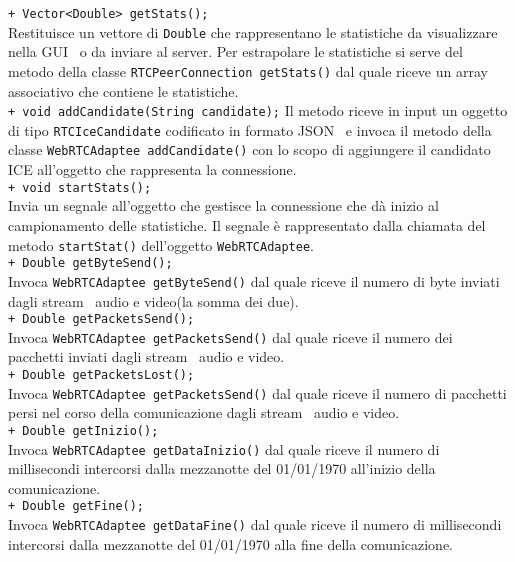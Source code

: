 {{\begin{sloppypar}
{{{\begin{itemize}
{					\texttt{+ Vector<Double> getStats();}\\
					Restituisce un vettore di \texttt{Double} che rappresentano le statistiche da visualizzare nella GUI\g~ o da inviare al server\g. Per estrapolare le statistiche si serve del metodo della classe \texttt{RTCPeerConnection getStats()} dal quale riceve un array associativo che contiene le statistiche.\\

					\texttt{+ void addCandidate(String candidate);}
					Il metodo riceve in input un oggetto di tipo \texttt{RTCIceCandidate} codificato in formato JSON\g~ e invoca il metodo della classe \texttt{WebRTCAdaptee addCandidate()} con lo scopo di aggiungere il candidato ICE all'oggetto che rappresenta la connessione.\\
					
					\texttt{+ void startStats();}\\
					Invia un segnale all'oggetto che gestisce la connessione che dà inizio al campionamento delle statistiche. Il segnale è rappresentato dalla chiamata del metodo \texttt{startStat()} dell'oggetto \texttt{WebRTCAdaptee}.\\
					
					\texttt{+ Double getByteSend();}\\
					Invoca \texttt{WebRTCAdaptee getByteSend()} dal quale riceve il numero di byte inviati dagli stream\g~ audio e video(la somma dei due).\\

					\texttt{+ Double getPacketsSend();}\\
					Invoca \texttt{WebRTCAdaptee getPacketsSend()} dal quale riceve il numero dei pacchetti inviati dagli stream\g~ audio e video.\\

					\texttt{+ Double getPacketsLost();}\\
					Invoca \texttt{WebRTCAdaptee getPacketsSend()} dal quale riceve il numero di pacchetti persi nel corso della comunicazione dagli stream\g~ audio e video.\\

					\texttt{+ Double getInizio();}\\
					Invoca \texttt{WebRTCAdaptee getDataInizio()} dal quale riceve il numero di millisecondi intercorsi dalla mezzanotte del 01/01/1970 all'inizio della comunicazione.\\

					\texttt{+ Double getFine();}\\
					Invoca \texttt{WebRTCAdaptee getDataFine()} dal quale riceve il numero di millisecondi intercorsi dalla mezzanotte del 01/01/1970 alla fine della comunicazione.\\
					
}
\end{itemize}}}}
\end{sloppypar}}}
